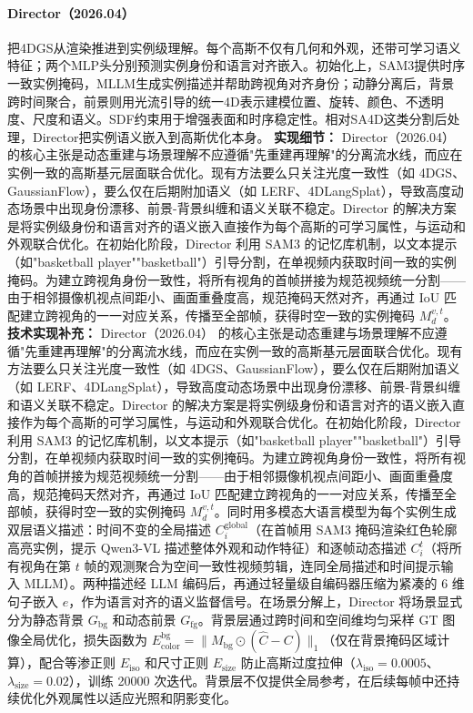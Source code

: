 \paragraph{Director（2026.04）\cite{2604_01678}}
把4DGS从渲染推进到实例级理解。每个高斯不仅有几何和外观，还带可学习语义特征；两个MLP头分别预测实例身份和语言对齐嵌入。初始化上，SAM3提供时序一致实例掩码，MLLM生成实例描述并帮助跨视角对齐身份；动静分离后，背景跨时间聚合，前景则用光流引导的统一4D表示建模位置、旋转、颜色、不透明度、尺度和语义。SDF约束用于增强表面和时序稳定性。相对SA4D这类分割后处理，Director把实例语义嵌入到高斯优化本身。
\textbf{实现细节：} Director（2026.04） 的核心主张是动态重建与场景理解不应遵循"先重建再理解"的分离流水线，而应在实例一致的高斯基元层面联合优化。现有方法要么只关注光度一致性（如 4DGS、GaussianFlow），要么仅在后期附加语义（如 LERF、4DLangSplat），导致高度动态场景中出现身份漂移、前景-背景纠缠和语义关联不稳定。Director 的解决方案是将实例级身份和语言对齐的语义嵌入直接作为每个高斯的可学习属性，与运动和外观联合优化。在初始化阶段，Director 利用 SAM3 的记忆库机制，以文本提示（如"basketball player""basketball"）引导分割，在单视频内获取时间一致的实例掩码。为建立跨视角身份一致性，将所有视角的首帧拼接为规范视频统一分割——由于相邻摄像机视点间距小、画面重叠度高，规范掩码天然对齐，再通过 IoU 匹配建立跨视角的一一对应关系，传播至全部帧，获得时空一致的实例掩码 $M^{v,t}_d$。
\textbf{技术实现补充：} Director（2026.04） 的核心主张是动态重建与场景理解不应遵循"先重建再理解"的分离流水线，而应在实例一致的高斯基元层面联合优化。现有方法要么只关注光度一致性（如 4DGS、GaussianFlow），要么仅在后期附加语义（如 LERF、4DLangSplat），导致高度动态场景中出现身份漂移、前景-背景纠缠和语义关联不稳定。Director 的解决方案是将实例级身份和语言对齐的语义嵌入直接作为每个高斯的可学习属性，与运动和外观联合优化。在初始化阶段，Director 利用 SAM3 的记忆库机制，以文本提示（如"basketball player""basketball"）引导分割，在单视频内获取时间一致的实例掩码。为建立跨视角身份一致性，将所有视角的首帧拼接为规范视频统一分割——由于相邻摄像机视点间距小、画面重叠度高，规范掩码天然对齐，再通过 IoU 匹配建立跨视角的一一对应关系，传播至全部帧，获得时空一致的实例掩码 $M^{v,t}_d$。同时用多模态大语言模型为每个实例生成双层语义描述：时间不变的全局描述 $C_i^{\mathrm{global}}$（在首帧用 SAM3 掩码渲染红色轮廓高亮实例，提示 Qwen3-VL 描述整体外观和动作特征）和逐帧动态描述 $C_i^t$（将所有视角在第 $t$ 帧的观测聚合为空间一致性视频剪辑，连同全局描述和时间提示输入 MLLM）。两种描述经 LLM 编码后，再通过轻量级自编码器压缩为紧凑的 6 维句子嵌入 $e$，作为语言对齐的语义监督信号。在场景分解上，Director 将场景显式分为静态背景 $G_{\mathrm{bg}}$ 和动态前景 $G_{\mathrm{fg}}$。背景层通过跨时间和空间维均匀采样 GT 图像全局优化，损失函数为 $E^{\mathrm{bg}}_{\mathrm{color}} = \|M_{\mathrm{bg}} \odot (\hat{C} - C)\|_1$（仅在背景掩码区域计算），配合等渗正则 $E_{\mathrm{iso}}$ 和尺寸正则 $E_{\mathrm{size}}$ 防止高斯过度拉伸（$\lambda_{\mathrm{iso}} = 0.0005$、$\lambda_{\mathrm{size}} = 0.02$），训练 20000 次迭代。背景层不仅提供全局参考，在后续每帧中还持续优化外观属性以适应光照和阴影变化。

